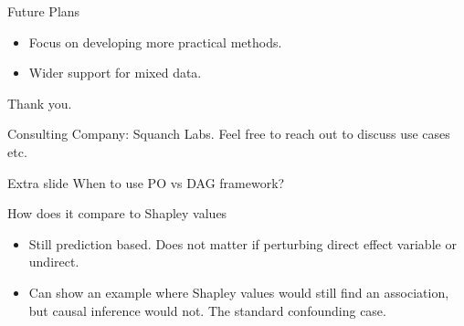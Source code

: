 \documentclass{beamer}
\begin{document}
\begin{frame}{Future Plans}
	\begin{itemize}
		\item Focus on developing more practical methods.
		\item Wider support for mixed data.
	\end{itemize}
\end{frame}

\begin{frame}
	Thank you.

	Consulting Company: Squanch Labs. Feel free to reach out to discuss use cases etc.
\end{frame}

\begin{frame}{Extra slide}
	When to use PO vs DAG framework?
\end{frame}

\begin{frame}
	How does it compare to Shapley values 
	\begin{itemize}
		\item Still prediction based. Does not matter if perturbing direct effect variable or undirect.
		\item Can show an example where Shapley values would still find an association, but causal inference would not. The standard confounding case.
	\end{itemize}
\end{frame}
\end{document}
